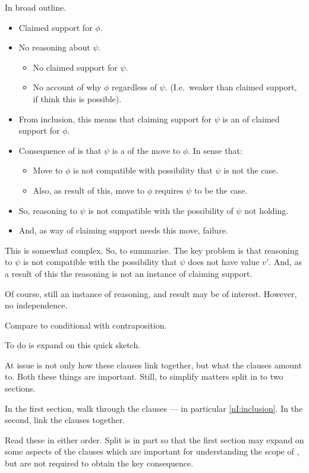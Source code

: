 \begin{note}
  In broad outline.

  \begin{itemize}
  \item Claimed support for \(\phi\).
  \item No reasoning about \(\psi\).
    \begin{itemize}
    \item No claimed support for \(\psi\).
    \item No account of why \(\phi\) regardless of \(\psi\). (I.e.\ weaker than claimed support, if think this is possible).
    \end{itemize}
  \item From inclusion, this means that claiming support for \(\psi\) is an \requ{} of claimed support for \(\phi\).
  \item Consequence of \requ{} is that \(\psi\) is a \requ{} of the move to \(\phi\).
    In sense that:
    \begin{itemize}
    \item Move to \(\phi\) is not compatible with possibility that \(\psi\) is not the case.
    \item Also, as result of this, move to \(\phi\) requires \(\psi\) to be the case.
    \end{itemize}
  \item So, reasoning to \(\psi\) is not compatible with the possibility of \(\psi\) not holding.
  \item And, as way of claiming support needs this move, failure.
  \end{itemize}

  This is somewhat complex.
  So, to summarise.
  The key problem is that reasoning to \(\psi\) is not compatible with the possibility that \(\psi\) does not have value \(v'\).
  And, as a result of this the reasoning is not an instance of claiming support.

  Of course, still an instance of reasoning, and result may be of interest.
  However, no independence.

  {
    \color{red}
    Compare to conditional with contraposition.
  }
\end{note}

\begin{note}
  To do is expand on this quick sketch.

  At issue is not only how these clauses link together, but what the clauses amount to.
  Both these things are important.
  Still, to simplify matters split in to two sections.

  In the first section, walk through the clauses --- in particular \ref{nI:inclusion}.
  In the second, link the clauses together.

  Read these in either order.
  Split is in part so that the first section may expand on some aspects of the clauses which are important for understanding the scope of \nI{}, but are not required to obtain the key consequence.
\end{note}




